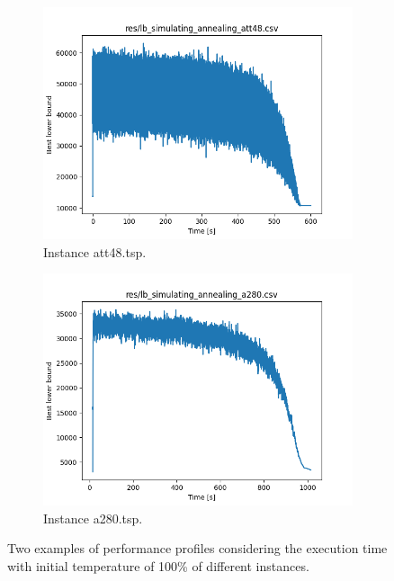 \begin{figure}[!h]
	\begin{subfigure}{.5\columnwidth}
		\centering
		\includegraphics[width=\columnwidth]{../res/lb_simulating_annealing_100_att48.png}
		\caption{Instance att48.tsp.}
		\label{fig:sim_ann_att48}
	\end{subfigure}
	\begin{subfigure}{.5\columnwidth}
		\centering
		\includegraphics[width=\columnwidth]{../res/lb_simulating_annealing_100_a280.png}
		\caption{Instance a280.tsp.}
		\label{fig:sim_ann_a280}
	\end{subfigure}
	\caption{Two examples of performance profiles considering the execution time with initial temperature of 100\% of different instances.}
	\label{fig:sim_ann_dataset}
\end{figure}

